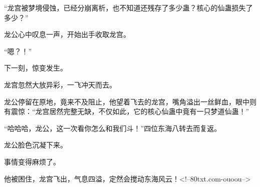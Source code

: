 \begin{this_body}
“龙宫被梦境侵蚀，已经分崩离析，也不知道还残存了多少蛊？核心的仙蛊损失了多少？”

龙公心中叹息一声，开始出手收取龙宫。

“嗯？！”

下一刻，惊变发生。

龙宫忽然大放异彩，一飞冲天而去。

龙公停留在原地，竟来不及阻止，他望着飞去的龙宫，嘴角溢出一丝鲜血，眼中则有震惊：“龙宫居然完整无缺，不仅如此，它的核心仙蛊中竟有一只梦道仙蛊！”

“哈哈哈，龙公，这一次看你怎么和我们斗！”四位东海八转去而复返。

龙公脸色沉凝下来。

事情变得麻烦了。

他被困住，龙宫飞出，气息四溢，定然会搅动东海风云！<!--80txt.com-ouoou-->

\end{this_body}

